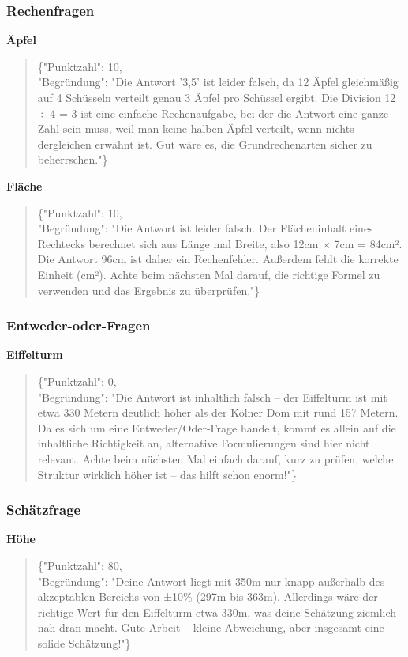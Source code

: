 \documentclass[a4paper,12pt]{article}
\begin{document}
\subsubsection{Rechenfragen}

\textbf{Äpfel}
\begin{quote}
\{"Punktzahl": 10,\\
"Begründung": "Die Antwort '3,5' ist leider falsch, da 12 Äpfel gleichmäßig auf 4 Schüsseln verteilt genau 3 Äpfel pro Schüssel ergibt. Die Division 12 ÷ 4 = 3 ist eine einfache Rechenaufgabe, bei der die Antwort eine ganze Zahl sein muss, weil man keine halben Äpfel verteilt, wenn nichts dergleichen erwähnt ist. Gut wäre es, die Grundrechenarten sicher zu beherrschen."\}
\end{quote}

\textbf{Fläche}
\begin{quote}
\{"Punktzahl": 10,\\
"Begründung": "Die Antwort ist leider falsch. Der Flächeninhalt eines Rechtecks berechnet sich aus Länge mal Breite, also 12cm × 7cm = 84cm². Die Antwort 96cm ist daher ein Rechenfehler. Außerdem fehlt die korrekte Einheit (cm²). Achte beim nächsten Mal darauf, die richtige Formel zu verwenden und das Ergebnis zu überprüfen."\}
\end{quote}

\subsubsection{Entweder-oder-Fragen}

\textbf{Eiffelturm}
\begin{quote}
\{"Punktzahl": 0,\\
"Begründung": "Die Antwort ist inhaltlich falsch – der Eiffelturm ist mit etwa 330 Metern deutlich höher als der Kölner Dom mit rund 157 Metern. Da es sich um eine Entweder/Oder-Frage handelt, kommt es allein auf die inhaltliche Richtigkeit an, alternative Formulierungen sind hier nicht relevant. Achte beim nächsten Mal einfach darauf, kurz zu prüfen, welche Struktur wirklich höher ist – das hilft schon enorm!"\}
\end{quote}

\subsubsection{Schätzfrage}

\textbf{Höhe}
\begin{quote}
\{"Punktzahl": 80,\\
"Begründung": "Deine Antwort liegt mit 350m nur knapp außerhalb des akzeptablen Bereichs von ±10\% (297m bis 363m). Allerdings wäre der richtige Wert für den Eiffelturm etwa 330m, was deine Schätzung ziemlich nah dran macht. Gute Arbeit – kleine Abweichung, aber insgesamt eine solide Schätzung!"\}
\end{quote}
\end{document}
